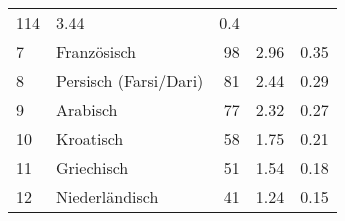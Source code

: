 \begin{longtable}{lXrrr}
       \num{114} &
       \num[round-mode=places,round-precision=2]{3,44} &
         \num[round-mode=places,round-precision=2]{0,4} \\

     7 &
     \multicolumn{1}{X}{ Französisch   } &


       \num{98} &
       \num[round-mode=places,round-precision=2]{2,96} &
         \num[round-mode=places,round-precision=2]{0,35} \\

     8 &
     \multicolumn{1}{X}{ Persisch (Farsi/Dari)   } &


       \num{81} &
       \num[round-mode=places,round-precision=2]{2,44} &
         \num[round-mode=places,round-precision=2]{0,29} \\

     9 &
     \multicolumn{1}{X}{ Arabisch   } &


       \num{77} &
       \num[round-mode=places,round-precision=2]{2,32} &
         \num[round-mode=places,round-precision=2]{0,27} \\

     10 &
     \multicolumn{1}{X}{ Kroatisch   } &


       \num{58} &
       \num[round-mode=places,round-precision=2]{1,75} &
         \num[round-mode=places,round-precision=2]{0,21} \\

     11 &
     \multicolumn{1}{X}{ Griechisch   } &


       \num{51} &
       \num[round-mode=places,round-precision=2]{1,54} &
         \num[round-mode=places,round-precision=2]{0,18} \\

     12 &
     \multicolumn{1}{X}{ Niederländisch   } &


       \num{41} &
       \num[round-mode=places,round-precision=2]{1,24} &
         \num[round-mode=places,round-precision=2]{0,15} \\


\end{longtable}
